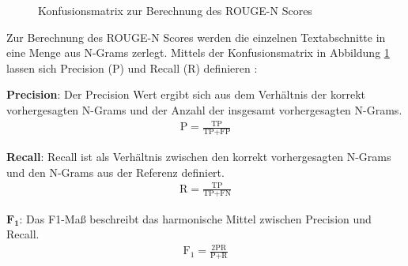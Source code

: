 \begin{figure}[h!]
    \centering
{}
\caption{Konfusionsmatrix zur Berechnung des ROUGE-N Scores}
\label{confusionmatrix}
\end{figure}

Zur Berechnung des ROUGE-N Scores werden die einzelnen Textabschnitte in eine Menge aus N-Grams zerlegt.
Mittels der Konfusionsmatrix in Abbildung \ref{confusionmatrix} lassen sich Precision (P) und Recall (R) definieren \citep{DBLP:journals/corr/abs-2010-16061}:
\begin{addmargin}[30pt]{30pt}
    \textbf{Precision}: 
    Der Precision Wert ergibt sich aus dem Verhältnis der korrekt vorhergesagten N-Grams und der Anzahl der insgesamt vorhergesagten N-Grams.
    \begin{align*}
    \text{P} = \frac{\text{TP}}{\text{TP}+\text{FP}}
    \end{align*}

    \textbf{Recall}:
    Recall ist als Verhältnis zwischen den korrekt vorhergesagten N-Grams und den N-Grams aus der Referenz definiert.
    \begin{align*}
    \text{R} = \frac{\text{TP}}{\text{TP}+\text{FN}}
    \end{align*}

    $\textbf{F}_\textbf{1}$:
    Das F1-Maß beschreibt das harmonische Mittel zwischen Precision und Recall.
    \begin{align*}
    \text{F}_\text{1} = \frac{2\text{PR}}{\text{P}+\text{R}}
    \end{align*}
\end{addmargin}

